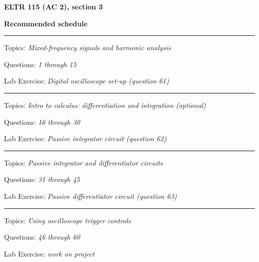 \vfil \eject

\centerline{\bf ELTR 115 (AC 2), section 3} \bigskip 
 
\vskip 10pt

\noindent
{\bf Recommended schedule}

\vskip 5pt

\hrule \vskip 5pt
\noindent
{}

\hskip 10pt Topics: {\it Mixed-frequency signals and harmonic analysis}
 
\hskip 10pt Questions: {\it 1 through 15}
 
\hskip 10pt Lab Exercise: {\it Digital oscilloscope set-up (question 61)}
 




\vskip 10pt
\hrule \vskip 5pt
\noindent
{}

\hskip 10pt Topics: {\it Intro to calculus: differentiation and integration (optional)}
 
\hskip 10pt Questions: {\it 16 through 30}
 
\hskip 10pt Lab Exercise: {\it Passive integrator circuit (question 62)}
 
\vskip 10pt
\hrule \vskip 5pt
\noindent
{}

\hskip 10pt Topics: {\it Passive integrator and differentiator circuits}
 
\hskip 10pt Questions: {\it 31 through 45}
 
\hskip 10pt Lab Exercise: {\it Passive differentiator circuit (question 63)}
 
\vskip 10pt
\hrule \vskip 5pt
\noindent
{}

\hskip 10pt Topics: {\it Using oscilloscope trigger controls}
 
\hskip 10pt Questions: {\it 46 through 60}
 
\hskip 10pt Lab Exercise: {\it work on project}


